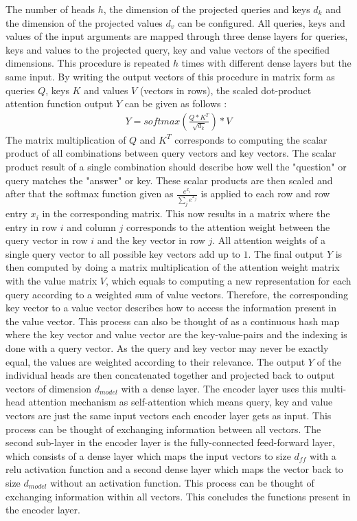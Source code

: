 \documentclass[draft,final]{vutinfth} %
\begin{document}
    The number of heads $h$, the dimension of the projected queries and keys $d_k$ and the dimension of the projected values $d_v$ can be configured.
    All queries, keys and values of the input arguments are mapped through three dense layers for queries, keys and values to the projected query, key and value vectors of the specified dimensions.
    This procedure is repeated $h$ times with different dense layers but the same input. 
    By writing the output vectors of this procedure in matrix form as queries $Q$, keys $K$ and values $V$ (vectors in rows), the scaled dot-product attention function output $Y$ can be given as follows \cite[p. 4]{Transformer}:
    \begin{align}
    Y = softmax \left( \frac{Q * K^T}{\sqrt{d_k}} \right) * V
    \end{align}
    The matrix multiplication of $Q$ and $K^T$ corresponds to computing the scalar product of all combinations between query vectors and key vectors.
    The scalar product result of a single combination should describe how well the "question" or query matches the "answer" or key.
    These scalar products are then scaled and after that the softmax function given as $\frac{e^{x_i}}{\sum_j{e^{x_j}}}$ is applied to each row and row entry $x_i$ in the corresponding matrix.
    This now results in a matrix where the entry in row $i$ and column $j$ corresponds to the attention weight between the query vector in row $i$ and the key vector in row $j$. 
    All attention weights of a single query vector to all possible key vectors add up to $1$.
    The final output $Y$ is then computed by doing a matrix multiplication of the attention weight matrix with the value matrix $V$, which equals to computing a new representation for each query according to a weighted sum of value vectors.
    Therefore, the corresponding key vector to a value vector describes how to access the information present in the value vector.
    This process can also be thought of as a continuous hash map where the key vector and value vector are the key-value-pairs and the indexing is done with a query vector.
    As the query and key vector may never be exactly equal, the values are weighted according to their relevance.
    The output $Y$ of the individual heads are then concatenated together and projected back to output vectors of dimension $d_{model}$ with a dense layer. 
    The encoder layer uses this multi-head attention mechanism as self-attention which means query, key and value vectors are just the same input vectors each encoder layer gets as input.
    This process can be thought of exchanging information between all vectors.
    The second sub-layer in the encoder layer is the fully-connected feed-forward layer, which consists of a dense layer which maps the input vectors to size $d_{ff}$ with a relu activation function and a second dense layer which maps the vector back to size $d_{model}$ without an activation function.
    This process can be thought of exchanging information within all vectors.
    This concludes the functions present in the encoder layer.
\end{document}
